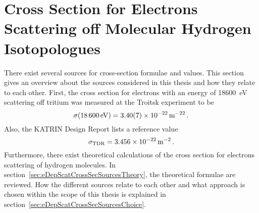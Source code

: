 \section{Cross Section for Electrons Scattering off Molecular Hydrogen Isotopologues}
\label{sec:eDepScatCrossSecSources}
There exist several sources for cross-section formulae and values. This section gives an overview about the sources considered in this thesis and how they relate to each other. First, the cross section for electrons with an energy of \SI{18600}{eV} scattering off tritium was measured at the Troitsk experiment to be~\cite{Aseev2000}
\begin{equation}
	\sigma(\SI{18600}{eV}) = \SI{3.40\pm0.07e-22}{m^{-22}} \fullstop
\end{equation}
Also, the KATRIN Design Report lists a reference value~\cite{Angrik:2005ep}
\begin{equation}
	\label{eq:eDepScatCrossSecSourcesCrossSecTDR}
	\sigma_\mathrm{TDR} = \SI{3.456e-22}{m^{-2}} \fullstop
\end{equation}
Furthermore, there exist theoretical calculations of the cross section for electrons scattering of hydrogen molecules. In section~\ref{sec:eDepScatCrossSecSourcesTheory}, the theoretical formulae are reviewed. How the different sources relate to each other and what approach is chosen within the scope of this thesis is explained in section~\ref{sec:eDepScatCrossSecSourcesChoice}.
